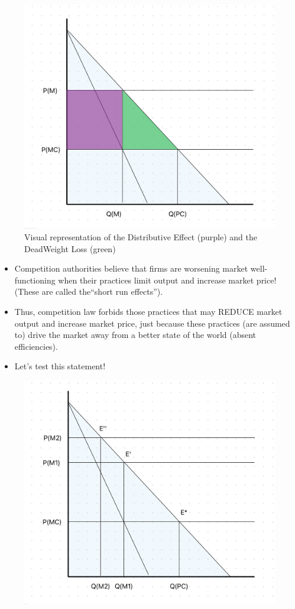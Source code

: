     \begin{figure}[h]
        \centering
        \includegraphics[width=0.68\linewidth]{graphics/DistributiveEffect_DWL.png}
        \caption{Visual representation of the Distributive Effect (purple) and the DeadWeight Loss (green)}
        \label{fig:DistribEffect_DWL}
    \end{figure}

    \begin{itemize}
        \item Competition authorities believe that firms are worsening market well-functioning when their practices limit output and increase market price! (These are called the“short run effects”). 
        \item Thus, competition law forbids those practices that may REDUCE market output and increase market price, just because these practices (are assumed to) drive the market away from a better state of the world (absent efficiencies).
        \item Let’s test this statement!
    \end{itemize}

    \begin{figure}[h]
        \centering
        \includegraphics[width=0.80\linewidth]{graphics/DifferentMonopolies2.png}
        \label{fig:different_monopolies}
    \end{figure}

